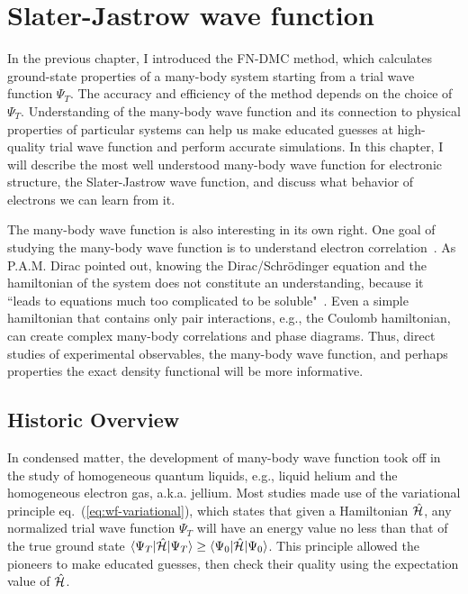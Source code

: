 \chapter{Slater-Jastrow wave function} \label{chap:sj-wf}

In the previous chapter, I introduced the FN-DMC method, which calculates ground-state properties of a many-body system starting from a trial wave function $\Psi_T$. The accuracy and efficiency of the method depends on the choice of $\Psi_T$.
Understanding of the many-body wave function and its connection to physical properties of particular systems can help us make educated guesses at high-quality trial wave function and perform accurate simulations.
In this chapter, I will describe the most well understood many-body wave function for electronic structure, the Slater-Jastrow wave function, and discuss what behavior of electrons we can learn from it.

The many-body wave function is also interesting in its own right. One goal of studying the many-body wave function is to understand electron correlation~\cite{Ceperley1999-wf}.
As P.A.M. Dirac pointed out, knowing the Dirac/Schr\"odinger equation and the hamiltonian of the system does not constitute an understanding, because it ``leads to equations much too complicated to be soluble"~\cite{Dirac1929}.
Even a simple hamiltonian that contains only pair interactions, e.g., the Coulomb hamiltonian, can create complex many-body correlations and phase diagrams.
Thus, direct studies of experimental observables, the many-body wave function, and perhaps properties the exact density functional will be more informative.


\section{Historic Overview}

In condensed matter, the development of many-body wave function took off in the study of homogeneous quantum liquids, e.g., liquid helium and the homogeneous electron gas, a.k.a. jellium. Most studies made use of the variational principle eq.~(\ref{eq:wf-variational}), which states that given a Hamiltonian $\hat{\mathcal{H}}$, any normalized trial wave function $\Psi_T$ will have an energy value no less than that of the true ground state $\braket{\Psi_T|\hat{\mathcal{H}}|\Psi_T}\ge\braket{\Psi_0|\hat{\mathcal{H}}|\Psi_0}$. This principle allowed the pioneers to make educated guesses, then check their quality using the expectation value of $\hat{\mathcal{H}}$.

